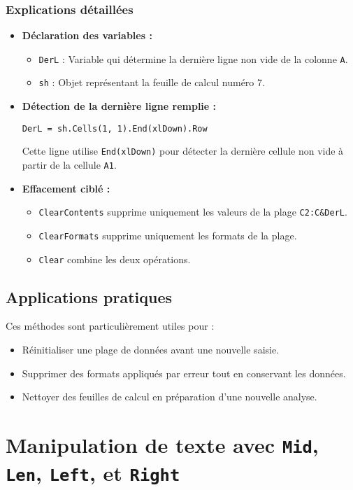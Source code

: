 \documentclass[a4paper,12pt]{report}
\begin{document}
\subsection*{Explications détaillées}

\begin{itemize}
	\item \textbf{Déclaration des variables :}
	\begin{itemize}
		\item \texttt{DerL} : Variable qui détermine la dernière ligne non vide de la colonne \texttt{A}.
		\item \texttt{sh} : Objet représentant la feuille de calcul numéro 7.
	\end{itemize}
	\item \textbf{Détection de la dernière ligne remplie :}
	\begin{lstlisting}[language=vbscript]
		DerL = sh.Cells(1, 1).End(xlDown).Row
	\end{lstlisting}
	Cette ligne utilise \texttt{End(xlDown)} pour détecter la dernière cellule non vide à partir de la cellule \texttt{A1}.
	\item \textbf{Effacement ciblé :}
	\begin{itemize}
		\item \texttt{ClearContents} supprime uniquement les valeurs de la plage \texttt{C2:C\&DerL}.
		\item \texttt{ClearFormats} supprime uniquement les formats de la plage.
		\item \texttt{Clear} combine les deux opérations.
	\end{itemize}
\end{itemize}

\section{Applications pratiques}

Ces méthodes sont particulièrement utiles pour :
\begin{itemize}
	\item Réinitialiser une plage de données avant une nouvelle saisie.
	\item Supprimer des formats appliqués par erreur tout en conservant les données.
	\item Nettoyer des feuilles de calcul en préparation d'une nouvelle analyse.
\end{itemize}

\chapter{Manipulation de texte avec \texttt{Mid}, \texttt{Len}, \texttt{Left}, et \texttt{Right}}
\end{document}

